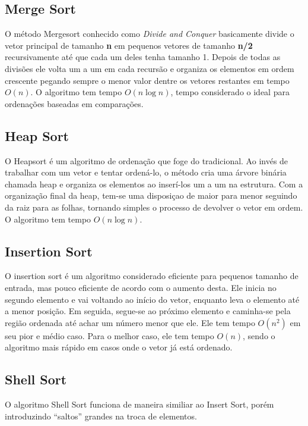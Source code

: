 \documentclass[11pt, brazil, a4paper, usenames, svgnames, dvipsnames]{article}
\begin{document}
\subsection{Merge Sort}

O método Mergesort conhecido como \textit{Divide and Conquer} basicamente divide o vetor principal de tamanho \textbf{n} em pequenos vetores de tamanho \textbf{n/2} recursivamente até que cada um deles tenha tamanho 1. Depois de todas as divisões ele volta um a um em cada recursão e organiza os elementos em ordem crescente pegando sempre o menor valor dentre os vetores restantes em tempo $O(n)$. O algoritmo tem tempo $O(n \log{n})$, tempo considerado o ideal para ordenações baseadas em comparações.
\noindent

\subsection{Heap Sort}

O Heapsort é um algoritmo de ordenação que foge do tradicional. Ao invés de trabalhar com um vetor e tentar ordená-lo, o método cria uma árvore binária chamada heap e organiza os elementos ao inserí-los um a um na estrutura. Com a organização final da heap, tem-se uma disposiçao de maior para menor seguindo da raiz para as folhas, tornando simples o processo de devolver o vetor em ordem. O algoritmo tem tempo $O(n \log{n})$.


\subsection{Insertion Sort}


O insertion sort é um algoritmo considerado eficiente para pequenos tamanho de entrada, mas pouco eficiente de acordo com o aumento desta. Ele inicia no segundo elemento e vai voltando ao início do vetor, enquanto leva o elemento até a menor posição. Em seguida, segue-se ao próximo elemento e caminha-se pela região ordenada até achar um número menor que ele. Ele tem tempo $O(n^2)$ em seu pior e médio caso. Para o melhor caso, ele tem tempo $O(n)$, sendo o algoritmo mais rápido em casos onde o vetor já está ordenado.

\subsection{Shell Sort}

O algoritmo Shell Sort funciona de maneira similiar ao Insert Sort, porém introduzindo
``saltos'' grandes na troca de elementos.
\end{document}
